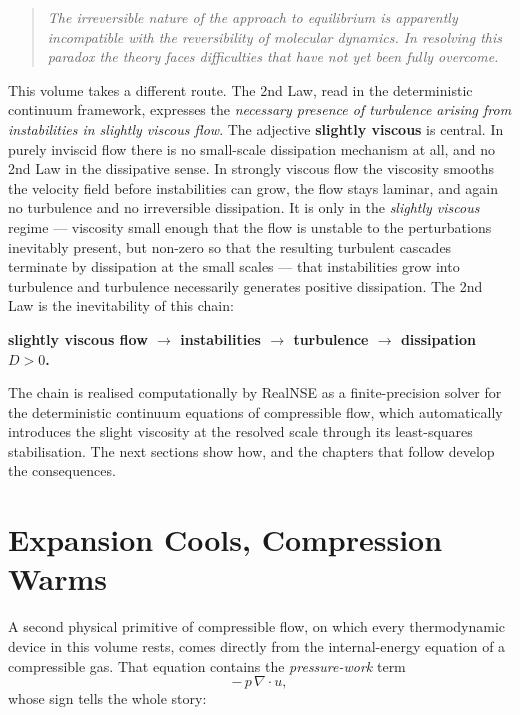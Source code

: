 \begin{quote}\itshape
The irreversible nature of the approach to equilibrium is apparently
incompatible with the reversibility of molecular dynamics. In resolving
this paradox the theory faces difficulties that have not yet been fully
overcome.
\end{quote}

This volume takes a different route. The 2nd Law, read in the
deterministic continuum framework, expresses the \emph{necessary
presence of turbulence arising from instabilities in slightly viscous
flow}. The adjective \textbf{slightly viscous} is central. In purely
inviscid flow there is no small-scale dissipation mechanism at all,
and no 2nd Law in the dissipative sense. In strongly viscous flow the
viscosity smooths the velocity field before instabilities can grow,
the flow stays laminar, and again no turbulence and no irreversible
dissipation. It is only in the \emph{slightly viscous} regime ---
viscosity small enough that the flow is unstable to the perturbations
inevitably present, but non-zero so that the resulting turbulent
cascades terminate by dissipation at the small scales --- that
instabilities grow into turbulence and turbulence necessarily generates
positive dissipation. The 2nd Law is the inevitability of this chain:
\begin{center}
\textbf{slightly viscous flow $\longrightarrow$ instabilities
$\longrightarrow$ turbulence $\longrightarrow$ dissipation $D > 0$.}
\end{center}
The chain is realised computationally by RealNSE as a finite-precision
solver for the deterministic continuum equations of compressible flow,
which automatically introduces the slight viscosity at the resolved
scale through its least-squares stabilisation. The next sections show
how, and the chapters that follow develop the consequences.

\section{Expansion Cools, Compression Warms}\label{sec:expansion_cools}

A second physical primitive of compressible flow, on which every
thermodynamic device in this volume rests, comes directly from the
internal-energy equation of a compressible gas. That equation contains
the \emph{pressure-work} term
\begin{equation}
  -\,p\,\nabla\!\cdot u,
  \label{eq:pdivu}
\end{equation}
whose sign tells the whole story:

